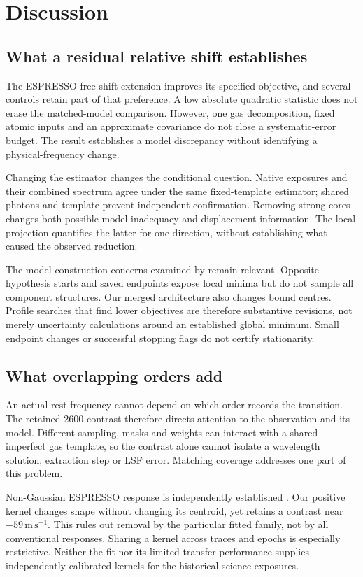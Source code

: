 \section{Discussion}
\label{sec:discussion}

\subsection{What a residual relative shift establishes}
The ESPRESSO free-shift extension improves its specified objective, and several controls retain part of that preference. A low absolute quadratic statistic does not erase the matched-model comparison. However, one gas decomposition, fixed atomic inputs and an approximate covariance do not close a systematic-error budget. The result establishes a model discrepancy without identifying a physical-frequency change.

Changing the estimator changes the conditional question. Native exposures and their combined spectrum agree under the same fixed-template estimator; shared photons and template prevent independent confirmation. Removing strong cores changes both possible model inadequacy and displacement information. The local projection quantifies the latter for one direction, without establishing what caused the observed reduction.

The model-construction concerns examined by \citet{Lee2023Models} remain relevant. Opposite-hypothesis starts and saved endpoints expose local minima but do not sample all component structures. Our merged architecture also changes bound centres. Profile searches that find lower objectives are therefore substantive revisions, not merely uncertainty calculations around an established global minimum. Small endpoint changes or successful stopping flags do not certify stationarity.

\subsection{What overlapping orders add}
An actual rest frequency cannot depend on which order records the transition. The retained 2600 contrast therefore directs attention to the observation and its model. Different sampling, masks and weights can interact with a shared imperfect gas template, so the contrast alone cannot isolate a wavelength solution, extraction step or LSF error. Matching coverage addresses one part of this problem.

Non-Gaussian ESPRESSO response is independently established \citep{Schmidt2024LSF}. Our positive kernel changes shape without changing its centroid, yet retains a contrast near $-59\,\mathrm{m\,s^{-1}}$. This rules out removal by the particular fitted family, not by all conventional responses. Sharing a kernel across traces and epochs is especially restrictive. Neither the fit nor its limited transfer performance supplies independently calibrated kernels for the historical science exposures.


